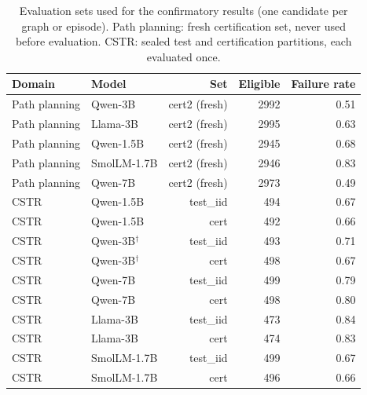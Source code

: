 \begin{table}[!htbp]
\centering
\small
\caption{Evaluation sets used for the confirmatory results (one candidate per graph or episode). Path planning: fresh certification set, never used before evaluation. CSTR: sealed test and certification partitions, each evaluated once.}
\label{tab:datasets}
\begin{tabular}{llrrr}
\toprule
Domain & Model & Set & Eligible & Failure rate \\
\midrule
Path planning & Qwen-3B & cert2 (fresh) & 2992 & 0.51 \\
Path planning & Llama-3B & cert2 (fresh) & 2995 & 0.63 \\
Path planning & Qwen-1.5B & cert2 (fresh) & 2945 & 0.68 \\
Path planning & SmolLM-1.7B & cert2 (fresh) & 2946 & 0.83 \\
Path planning & Qwen-7B & cert2 (fresh) & 2973 & 0.49 \\
CSTR & Qwen-1.5B & test\_iid & 494 & 0.67 \\
CSTR & Qwen-1.5B & cert & 492 & 0.66 \\
CSTR & Qwen-3B$^\dagger$ & test\_iid & 493 & 0.71 \\
CSTR & Qwen-3B$^\dagger$ & cert & 498 & 0.67 \\
CSTR & Qwen-7B & test\_iid & 499 & 0.79 \\
CSTR & Qwen-7B & cert & 498 & 0.80 \\
CSTR & Llama-3B & test\_iid & 473 & 0.84 \\
CSTR & Llama-3B & cert & 474 & 0.83 \\
CSTR & SmolLM-1.7B & test\_iid & 499 & 0.67 \\
CSTR & SmolLM-1.7B & cert & 496 & 0.66 \\
\bottomrule
\end{tabular}
\end{table}

